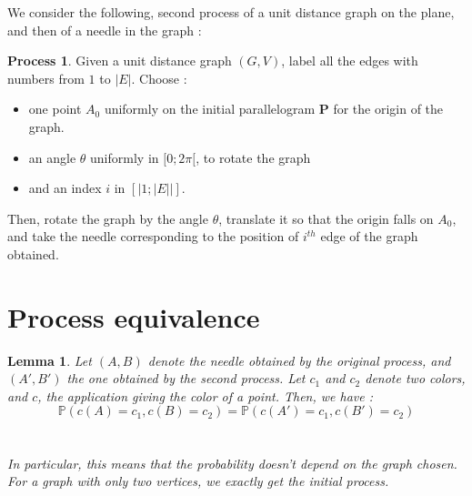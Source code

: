 \documentclass[a4paper,11pt]{article}
\newtheorem{lemma}{Lemma}
\theoremstyle{definition}
\newtheorem{process}{Process}
\theoremstyle{remark}
\begin{document}
We consider the following, second process of a unit distance graph on the 
plane, and then of a needle in the graph :
\begin{process}
Given a unit distance graph $(G,V)$, label all the edges with numbers from 
$1$ to $|E|$. Choose : 
\begin{itemize}
\item one point $A_0$ uniformly on the initial parallelogram $\mathbf{P}$ for 
the origin of the graph.
\item an angle $\theta$ uniformly in $[0;2\pi[$, to rotate the graph
\item and an index $i$ in $[|1;|E||]$.
\end{itemize}
Then, rotate the graph by the angle $\theta$, translate it so that the origin 
falls on  $A_0$, and take the needle corresponding to the position of $i^{th}$ 
edge of the graph obtained. 
\end{process}
\vspace{1 cm} 

\section{Process equivalence}
\label{equiv}
\begin{lemma}\label{huitre}
Let $(A,B)$ denote the needle obtained by the original process, and
$(A',B')$ the one obtained by the second process. Let $c_1$ and $c_2$ denote 
two colors, and $c$, the application giving the color of a point. Then, we 
have :\\
 $$\mathbb{P}(c(A) = c_1 , c(B) = c_2) = \mathbb{P}(c(A') = c_1, c(B') = c_2) $$ \\
 \\
 In particular, this means that the probability doesn't depend on the graph 
 chosen. For a graph with only two vertices, we exactly get the initial process.
\end{lemma}
\end{document}
